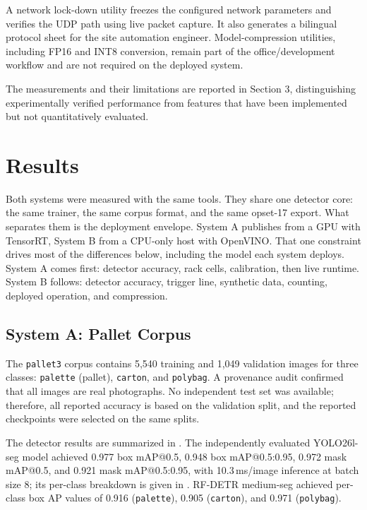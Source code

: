 \documentclass[9pt,a4paper,twocolumn]{rho-class/rho}
\begin{document}
A network lock-down utility freezes the configured network parameters and verifies the UDP path using live packet capture. It also generates a bilingual protocol sheet for the site automation engineer. Model-compression utilities, including FP16 and INT8 conversion, remain part of the office/development workflow and are not required on the deployed system.

The measurements and their limitations are reported in Section 3, distinguishing experimentally verified performance from features that have been implemented but not quantitatively evaluated.

\section{Results}

Both systems were measured with the same tools. They share one detector core: the same trainer, the same corpus format, and the same opset-17 export. What separates them is the deployment envelope. System A publishes from a GPU with TensorRT, System B from a CPU-only host with OpenVINO. That one constraint drives most of the differences below, including the model each system deploys. System A comes first: detector accuracy, rack cells, calibration, then live runtime. System B follows: detector accuracy, trigger line, synthetic data, counting, deployed operation, and compression.


\subsection{System A: Pallet Corpus}

The \texttt{pallet3} corpus contains 5{,}540 training and 1{,}049 validation images for three classes: \texttt{palette} (pallet), \texttt{carton}, and \texttt{polybag}. A provenance audit confirmed that all images are real photographs. No independent test set was available; therefore, all reported accuracy is based on the validation split, and the reported checkpoints were selected on the same splits.

The detector results are summarized in . The independently evaluated YOLO26l-seg model achieved 0.977 box mAP@0.5, 0.948 box mAP@0.5:0.95, 0.972 mask mAP@0.5, and 0.921 mask mAP@0.5:0.95, with 10.3\,ms/image inference at batch size 8; its per-class breakdown is given in . RF-DETR medium-seg achieved per-class box AP values of 0.916 (\texttt{palette}), 0.905 (\texttt{carton}), and 0.971 (\texttt{polybag}).
\end{document}
